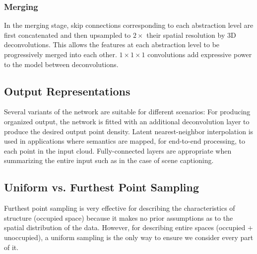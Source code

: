 \documentclass[runningheads]{llncs}
\begin{document}
\subsubsection{Merging}
In the merging stage, skip connections corresponding to each abstraction level are first concatenated and then upsampled to $2\times$ their spatial resolution by 3D deconvolutions. This allows the features at each abstraction level to be progressively merged into each other. $1\times 1\times 1$ convolutions add expressive power to the model between deconvolutions.

\subsection{Output Representations}

Several variants of the network are suitable for different scenarios: For producing organized output, the network is fitted with an additional deconvolution layer to produce the desired output point density. Latent nearest-neighbor interpolation is used in applications where semantics are mapped, for end-to-end processing, to each point in the input cloud. Fully-connected layers are appropriate when summarizing the entire input such as in the case of scene captioning.\\

\subsection{Uniform vs. Furthest Point Sampling}

Furthest point sampling is very effective for describing the characteristics of structure (occupied space) because it makes no prior assumptions as to the spatial distribution of the data. However, for describing entire spaces (occupied + unoccupied), a uniform sampling is the only way to ensure we consider every part of it.


\end{document}
